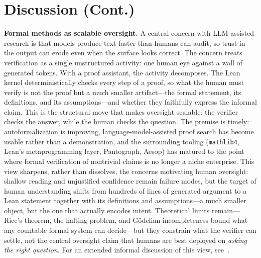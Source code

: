 \documentclass{article}
\begin{document}
\section{Discussion (Cont.)}
\textbf{Formal methods as scalable oversight.}
A central concern with LLM-assisted research is that models produce text faster than humans can audit, so trust in the output can erode even when the surface looks correct.
The concern treats verification as a single unstructured activity: one human eye against a wall of generated tokens.
With a proof assistant, the activity decomposes.
The Lean kernel deterministically checks every step of a proof, so what the human must verify is not the proof but a much smaller artifact---the formal statement, its definitions, and its assumptions---and whether they faithfully express the informal claim.
This is the structural move that makes oversight scalable: the verifier checks the answer, while the human checks the question.
The premise is timely: autoformalization is improving, language-model-assisted proof search has become usable rather than a demonstration, and the surrounding tooling (\texttt{mathlib4}, Lean's metaprogramming layer, Pantograph, Aesop) has matured to the point where formal verification of nontrivial claims is no longer a niche enterprise.
This view sharpens, rather than dissolves, the concerns motivating human oversight: shallow reading and unjustified confidence remain failure modes, but the target of human understanding shifts from hundreds of lines of generated argument to a Lean statement together with its definitions and assumptions---a much smaller object, but the one that actually encodes intent.
Theoretical limits remain---Rice's theorem, the halting problem, and G\"odelian incompleteness bound what any countable formal system can decide---but they constrain what the verifier can settle, not the central oversight claim that humans are best deployed on \emph{asking the right question}.
For an extended informal discussion of this view, see~\citep{miranda2026formaloversight}.
\end{document}
